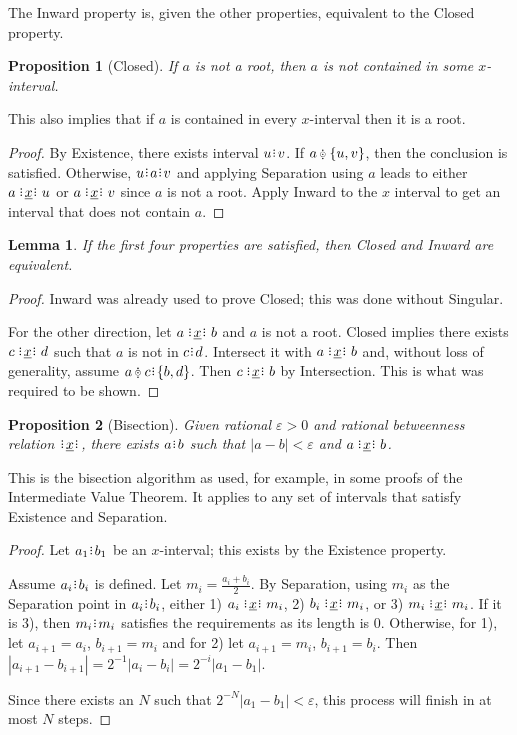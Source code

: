 \documentclass[12pt]{article}
\newtheorem{lemma}{Lemma}[section]
\newtheorem{proposition}{Proposition}[section]
\begin{document}
The Inward property is, given the other properties, equivalent to the Closed property.

\begin{proposition}[Closed]\label{br--closed} 
    If $a$ is not a root, then $a$ is not contained in some $x$-interval. 
\end{proposition}

This also implies that if $a$ is contained in every $x$-interval then it is a root. 

\begin{proof}
    By Existence, there exists interval $u \rint v$. If $a \betneq \{u, v\}$, then the conclusion is satisfied. Otherwise, $u \rint a \rint v$ and applying Separation using $a$ leads to either $a \xrel u$ or $a \xrel v$ since $a$ is not a root. Apply Inward to the $x$ interval to get an interval that does not contain $a$. 
\end{proof}

\begin{lemma}
    If the first four properties are satisfied, then Closed and Inward are equivalent.
\end{lemma}

\begin{proof}
    Inward was already used to prove Closed; this was done without Singular. 

    For the other direction, let $a \xrel b$ and $a$ is not a root. Closed implies there exists $c \xrel d$ such that $a$ is not in $c \rint d$. Intersect it with $a \xrel b$ and, without loss of generality, assume $a \betneq c \rint \{b,d\}$. Then $c \xrel b$ by Intersection. This is what was required to be shown.
\end{proof}


\begin{proposition}[Bisection]\label{br--prop--bisection}
    Given rational $\varepsilon >0$ and rational betweenness relation $\xrel$, there exists $a \rint b$ such that $|a-b| < \varepsilon$ and $a \xrel b$. 
\end{proposition}

This is the bisection algorithm as used, for example, in some proofs of the Intermediate Value Theorem. It applies to any set of intervals that satisfy Existence and Separation. 

\begin{proof}
    Let $a_1\rint b_1$ be an $x$-interval; this exists by the Existence property.
    
    Assume $a_i\rint b_i$ is defined. Let $m_i = \frac{a_i + b_i}{2}$. By Separation, using $m_i$ as the Separation point in $a_i \rint b_i$, either 1) $a_i \xrel m_i$, 2) $b_i \xrel m_i$, or 3) $m_i \xrel m_i$. If it is 3), then $m_i\rint m_i$ satisfies the requirements as its length is 0. Otherwise, for 1), let $a_{i+1}= a_i$, $b_{i+1} = m_i$ and for 2) let $a_{i+1} = m_i$, $b_{i+1} = b_i$. Then $|a_{i+1} - b_{i+1}| = 2^{-1} |a_i-b_i|= 2^{-i} |a_1-b_1|$. 

    Since there exists an $N$ such that $2^{-N} |a_1-b_1| < \varepsilon$, this process will finish in at most $N$ steps. 
\end{proof}
\end{document}
